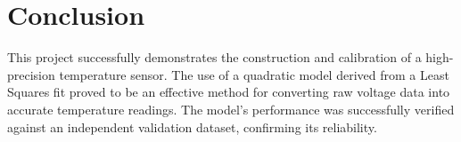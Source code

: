 \documentclass[conference]{IEEEtran}
\begin{document}
\section{Conclusion}
This project successfully demonstrates the construction and calibration of a high-precision temperature sensor. The use of a quadratic model derived from a Least Squares fit proved to be an effective method for converting raw voltage data into accurate temperature readings. The model's performance was successfully verified against an independent validation dataset, confirming its reliability.
\end{document}
